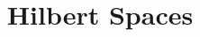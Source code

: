 \documentclass{article}
\begin{document}
\title{Hilbert Spaces}

\maketitle

\label{section-phantom}


\tableofcontents
\newpage







\end{document}
